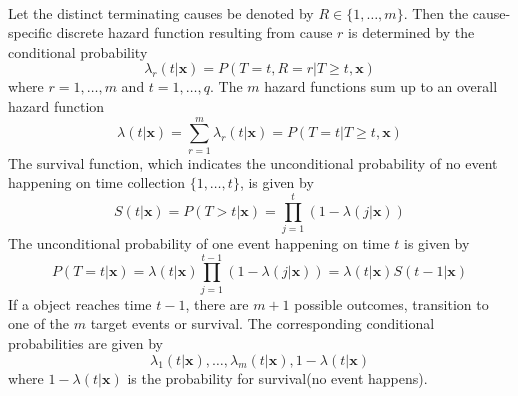 \documentclass[]{article}
\begin{document}
    \paragraph{}Let the distinct terminating causes be denoted by $R \in \{1,\dots, m\}$. Then the cause-specific discrete hazard function resulting from cause $r$ is determined by the conditional probability
    \begin{equation}
        \lambda_r(t|\mathbf{x}) = P(T = t, R = r | T \geq t, \mathbf{x})
    \end{equation}
    where $r = 1,\dots,m$ and $t = 1,\dots,q$. The $m$ hazard functions sum up to an overall hazard function
    \begin{equation}
        \lambda(t|\mathbf{x}) = \sum_{r = 1}^{m} \lambda_r(t|\mathbf{x}) = P(T = t | T \geq t, \mathbf{x})
    \end{equation}
    The survival function, which indicates the unconditional probability of no event happening on time collection $\{1,\dots,t\}$, is given by
    \begin{equation}
        S(t|\mathbf{x}) = P(T > t | \mathbf{x}) = \prod_{j = 1}^{t} (1-\lambda(j|\mathbf{x}))
    \end{equation}
    The unconditional probability of one event happening on time $t$ is given by
    \begin{equation}
        P(T= t|\mathbf{x}) = \lambda(t|\mathbf{x}) \prod_{j = 1}^{t-1} (1-\lambda(j|\mathbf{x})) = \lambda(t|\mathbf{x}) S(t-1|\mathbf{x})
    \end{equation}
    If a object reaches time $t-1$, there are $m + 1$ possible outcomes, transition to one of the $m$ target events or survival. The corresponding conditional
    probabilities are given by 
    \begin{equation}
        \lambda_1(t|\mathbf{x}),\dots,\lambda_m(t|\mathbf{x}), 1-\lambda(t|\mathbf{x})
    \end{equation}
    where $1-\lambda(t|\mathbf{x})$ is the probability for survival(no event happens).
\end{document}
